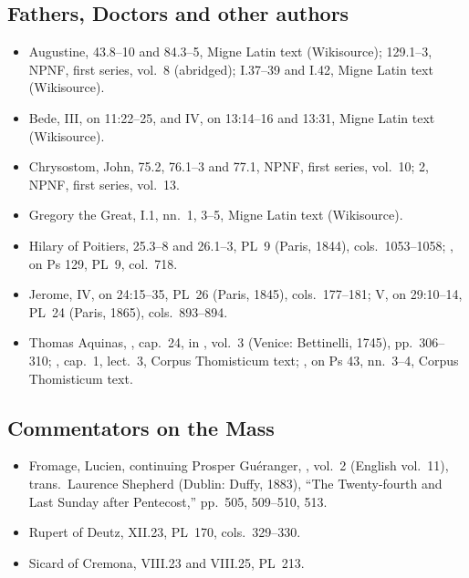 {\subsection*{Fathers, Doctors and other authors}
\begin{itemize}[leftmargin=1.2em,itemsep=.25em]
\item Augustine,  43.8--10 and 84.3--5, Migne
Latin text (Wikisource); 129.1--3, NPNF, first series, vol.~8 (abridged);
 I.37--39 and I.42, Migne Latin text
(Wikisource).
\item Bede,  III, on 11:22--25, and IV, on
13:14--16 and 13:31, Migne Latin text (Wikisource).
\item Chrysostom, John,  75.2, 76.1--3 and 77.1,
NPNF, first series, vol.~10;  2, NPNF, first
series, vol.~13.
\item Gregory the Great,  I.1, nn.~1, 3--5, Migne
Latin text (Wikisource).
\item Hilary of Poitiers,  25.3--8
and 26.1--3, PL~9 (Paris, 1844), cols.~1053--1058; , on Ps 129, PL~9, col.~718.
\item Jerome,  IV, on 24:15--35, PL~26 (Paris,
1845), cols.~177--181;  V, on 29:10--14, PL~24 (Paris,
1865), cols.~893--894.
\item Thomas Aquinas, , cap.~24, in
, vol.~3 (Venice: Bettinelli, 1745), pp.~306--310;
, cap.~1, lect.~3, Corpus Thomisticum
text; , on Ps 43, nn.~3--4, Corpus Thomisticum text.
\end{itemize}

\subsection*{Commentators on the Mass}
\begin{itemize}[leftmargin=1.2em,itemsep=.25em]
\item Fromage, Lucien, continuing Prosper Guéranger, , vol.~2 (English vol.~11), trans.\ Laurence
Shepherd (Dublin: Duffy, 1883), ``The Twenty-fourth and Last Sunday after
Pentecost,'' pp.~505, 509--510, 513.
\item Rupert of Deutz,  XII.23, PL~170,
cols.~329--330.
\item Sicard of Cremona,  VIII.23 and VIII.25, PL~213.
\end{itemize}
\par}
